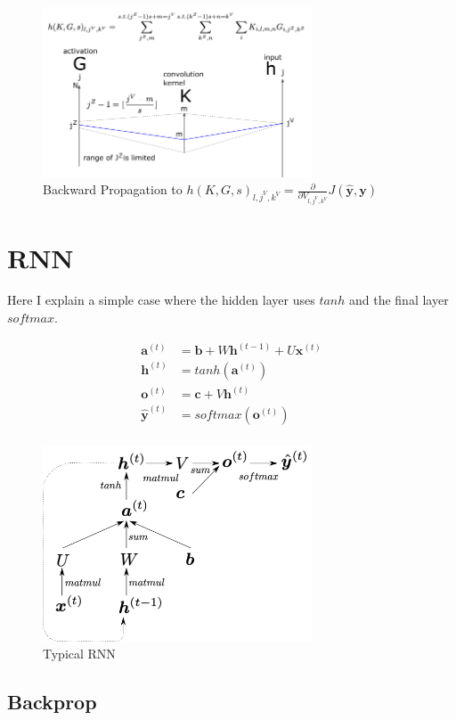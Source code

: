 \documentclass[a4]{article}
\begin{document}
\begin{figure}[!htb]
\centering
\includegraphics[width=8cm]{cnn_bp_h.png}
\caption{Backward Propagation to  $h(K,G,s)_{l,j^V,k^V} = \frac{\partial}{\partial V_{l,j^V,k^V}}J(\hat{\bm{y}}, \bm{y})$}
\label{fig:cnn_bk_h}
\end{figure}


\section{RNN}
Here I explain a simple case where the hidden layer uses $tanh$ and the final layer $softmax$.

\begin{equation}
\begin{aligned}
\bm{a}^{(t)} &= \bm{b} + W\bm{h}^{(t-1)} + U\bm{x}^{(t)}\\
\bm{h}^{(t)} &= tanh(\bm{a}^{(t)})\\
\bm{o}^{(t)} &= \bm{c}+ V\bm{h}^{(t)}\\
\hat{\bm{y}}^{(t)} &= softmax(\bm{o}^{(t)})\\
\end{aligned}
\end{equation}


\begin{figure}[!htb]
\centering
\includegraphics[width=8cm]{rnn.png}
\caption{Typical RNN}
\label{fig:rnn}
\end{figure}

\subsection{Backprop}
\end{document}
